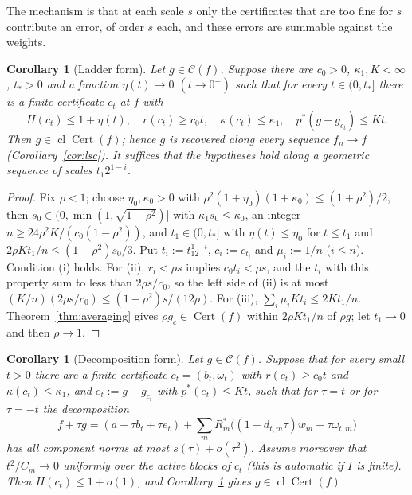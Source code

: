 \documentclass[10pt]{amsart}
\newtheorem{corollary}[theorem]{Corollary}
\theoremstyle{definition}
\theoremstyle{remark}
\newcommand{\Cset}{\mathcal C}
\newcommand{\Cert}{\operatorname{Cert}}
\newcommand{\cl}{\operatorname{cl}}
\begin{document}
The mechanism is that at each scale $s$ only the certificates that are too
fine for $s$ contribute an error, of order $s$ each, and these errors are
summable against the weights.

\begin{corollary}[Ladder form]\label{cor:ladder}
Let $g\in\Cset(f)$.  Suppose there are $c_0>0$, $\kappa_1,K<\infty$, $t_*>0$
and a function $\eta(t)\to0$ $(t\to0^+)$ such that for every $t\in(0,t_*]$
there is a finite certificate $c_t$ at $f$ with
\[
 H(c_t)\le1+\eta(t),\quad r(c_t)\ge c_0t,\quad \kappa(c_t)\le\kappa_1,\quad
 p^*(g-g_{c_t})\le Kt.
\]
Then $g\in\cl\Cert(f)$; hence $g$ is recovered along every sequence
$f_n\to f$ \textup{(}Corollary~\ref{cor:lsc}\textup{)}.  It suffices that
the hypotheses hold along a geometric sequence of scales $t_1 2^{1-i}$.
\end{corollary}

\begin{proof}
Fix $\rho<1$; choose $\eta_0,\kappa_0>0$ with
$\rho^2(1+\eta_0)(1+\kappa_0)\le(1+\rho^2)/2$, then
$s_0\in(0,\min(1,\sqrt{1-\rho^2})]$ with $\kappa_1s_0\le\kappa_0$, an integer
$n\ge24\rho^2K/(c_0(1-\rho^2))$, and $t_1\in(0,t_*]$ with $\eta(t)\le\eta_0$
for $t\le t_1$ and $2\rho Kt_1/n\le(1-\rho^2)s_0/3$.  Put $t_i:=t_12^{1-i}$,
$c_i:=c_{t_i}$ and $\mu_i:=1/n$ ($i\le n$).  Condition (i) holds.  For (ii),
$r_i<\rho s$ implies $c_0t_i<\rho s$, and the $t_i$ with this property sum
to less than $2\rho s/c_0$, so the left side of (ii) is at most
$(K/n)(2\rho s/c_0)\le(1-\rho^2)s/(12\rho)$.  For (iii),
$\sum_i\mu_iKt_i\le2Kt_1/n$.  Theorem~\ref{thm:averaging} gives $\rho
g_{c}\in\Cert(f)$ within $2\rho Kt_1/n$ of $\rho g$; let $t_1\to0$ and then
$\rho\to1$.
\end{proof}

\begin{corollary}[Decomposition form]\label{cor:decomposition}
Let $g\in\Cset(f)$.  Suppose that for every small $t>0$ there are a finite
certificate $c_t=(b_t,\omega_t)$ with $r(c_t)\ge c_0t$ and
$\kappa(c_t)\le\kappa_1$, and $e_t:=g-g_{c_t}$ with $p^*(e_t)\le Kt$, such
that for $\tau=t$ or for $\tau=-t$ the decomposition
\[
 f+\tau g=(a+\tau b_t+\tau e_t)+\sum_mR_m^*\big((1-d_{t,m}\tau)w_m+\tau
 \omega_{t,m}\big)
\]
has all component norms at most $s(\tau)+o(\tau^2)$.  Assume moreover that
$t^2/C_m\to0$ uniformly over the active blocks of $c_t$ \textup{(}this is
automatic if $I$ is finite\textup{)}.  Then $H(c_t)\le1+o(1)$, and
Corollary~\ref{cor:ladder} gives $g\in\cl\Cert(f)$.
\end{corollary}
\end{document}
